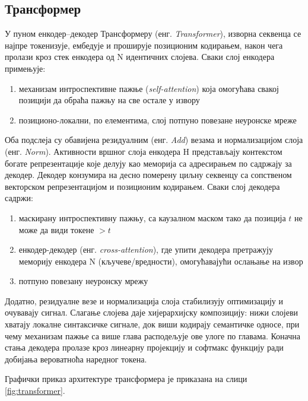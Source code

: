 \subsection{Трансформер}

У пуном енкодер--декодер Трансформеру (енг. \textit{Transformer}), изворна секвенца се најпре токенизује, ембедује и проширује позиционим кодирањем, након чега пролази кроз стек енкодера од N идентичних слојева. Сваки слој енкодера примењује:

\begin{enumerate}
\item механизам интроспективне пажње (\textit{self-attention}) која омогућава свакој позицији да обраћа пажњу на све остале у извору
\item позиционо-локални, по елементима, слој потпуно повезане неуронске мреже
\end{enumerate}

Оба подслеја су обавијена резидуалним (енг. \textit{Add}) везама и нормализацијом слоја (енг. \textit{Norm}). Активности вршног слоја енкодера H представљају контекстом богате репрезентације које делују као меморија са адресирањем по садржају за декодер. Декодер конзумира на десно померену циљну секвенцу са сопственом векторском репрезентацијом и позиционим кодирањем. Сваки слој декодера садржи:

\begin{enumerate}
\item маскирану интроспективну пажњу, са каузалном маском тако да позиција $t$ не може да види токене $> t$
\item енкодер-декодер (енг. \textit{cross-attention}), где упити декодера претражују меморију енкодера N (кључеве/вредности), омогућавајући ослањање на извор
\item потпуно повезану неуронску мрежу
\end{enumerate}

Додатно, резидуалне везе и нормализација слоја стабилизују оптимизацију и очувавају сигнал. Слагање слојева даје хијерархијску композицију: нижи слојеви хватају локалне синтаксичке сигнале, док виши кодирају семантичке односе, при чему механизам пажње са више глава расподељује ове улоге по главама. Коначна стања декодера пролазе кроз линеарну пројекцију и софтмакс функцију ради добијања вероватноћа наредног токена.

Графички приказ архитектуре трансформера је приказана на слици \ref{fig:transformer}.

